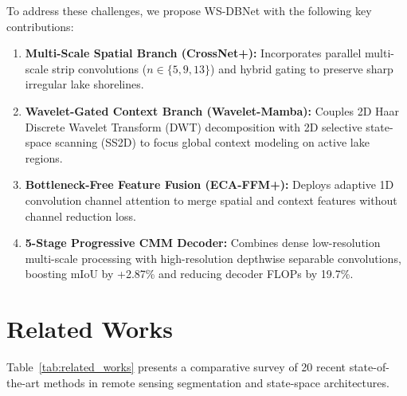 \documentclass[journal]{IEEEtran}
\begin{document}
To address these challenges, we propose WS-DBNet with the following key contributions:
\begin{enumerate}
    \item \textbf{Multi-Scale Spatial Branch (CrossNet+):} Incorporates parallel multi-scale strip convolutions ($n \in \{5, 9, 13\}$) and hybrid gating to preserve sharp irregular lake shorelines.
    \item \textbf{Wavelet-Gated Context Branch (Wavelet-Mamba):} Couples 2D Haar Discrete Wavelet Transform (DWT) decomposition with 2D selective state-space scanning (SS2D) to focus global context modeling on active lake regions.
    \item \textbf{Bottleneck-Free Feature Fusion (ECA-FFM+):} Deploys adaptive 1D convolution channel attention to merge spatial and context features without channel reduction loss.
    \item \textbf{5-Stage Progressive CMM Decoder:} Combines dense low-resolution multi-scale processing with high-resolution depthwise separable convolutions, boosting mIoU by +2.87\% and reducing decoder FLOPs by 19.7\%.
\end{enumerate}

\section{Related Works}
Table~\ref{tab:related_works} presents a comparative survey of 20 recent state-of-the-art methods in remote sensing segmentation and state-space architectures.
\end{document}
